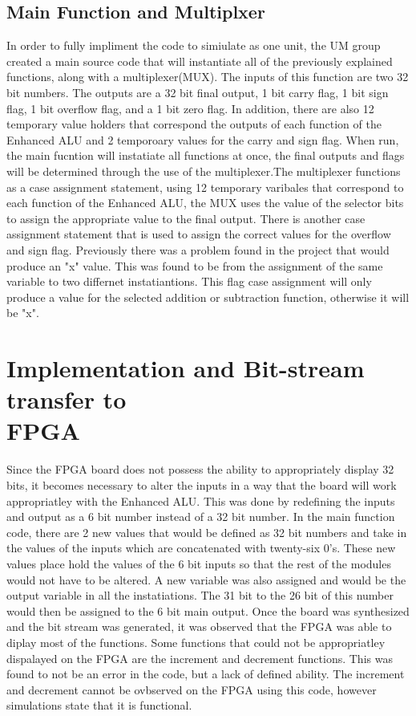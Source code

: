 \documentclass{article}
\begin{document}
\subsection{Main Function and Multiplxer}
In order to fully impliment the code to simiulate as one unit, the UM group created a main source code that will instantiate all of the previously explained functions, along with a multiplexer(MUX). The inputs of this function are two 32 bit numbers. The outputs are a 32 bit final output, 1 bit carry flag, 1 bit sign flag, 1 bit overflow flag, and a 1 bit zero flag. In addition, there are also 12 temporary value holders that correspond the outputs of each function of the Enhanced ALU and 2 temporoary values for the carry and sign flag. When run, the main fucntion will instatiate all functions at once, the final outputs and flags will be determined through the use of the multiplexer.\newline\newline The multiplexer functions as a case assignment statement, using 12 temporary varibales that correspond to each function of the Enhanced ALU, the MUX uses the value of the selector bits to assign the appropriate value to the final output. There is another case assignment statement that is used to assign the correct values for the overflow and sign flag. Previously there was a problem found in the project that would produce an "x" value. This was found to be from the assignment of the same variable to two differnet instatiantions. This flag case assignment will only produce a value for the selected addition or subtraction function, otherwise it will be "x".
\section{Implementation and Bit-stream transfer to \\ FPGA}
Since the FPGA board does not possess the ability to appropriately display 32 bits, it becomes necessary to alter the inputs in a way that the board will work appropriatley with the Enhanced ALU. This was done by redefining the inputs and output as a 6 bit number instead of a 32 bit number. In the main function code, there are 2 new values that would be defined as 32 bit numbers and take in the values of the inputs which are concatenated with twenty-six 0's. These new values place hold the values of the 6 bit inputs so that the rest of the modules would not have to be altered. A new variable was also assigned and would be the output variable in all the instatiations. The 31 bit to the 26 bit of this number would then be assigned to the 6 bit main output. \newline\newline Once the board was synthesized and the bit stream was generated, it was observed that the FPGA was able to diplay most of the functions. Some functions that could not be appropriatley dispalayed on the FPGA are the increment and decrement functions. This was found to not be an error in the code, but a lack of defined ability. The increment and decrement cannot be ovbserved on the FPGA using this code, however simulations state that it is functional.
\end{document}
